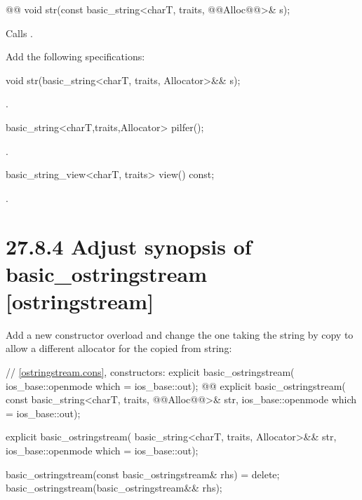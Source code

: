 \documentclass[ebook,11pt,article]{memoir}
\begin{document}
\begin{itemdecl}
    @@
    void str(const basic_string<charT, traits, @@Alloc@@>& s);
\end{itemdecl}

\begin{itemdescr}
\pnum
\effects
Calls
.
\end{itemdescr}


Add the following specifications:

\begin{addedblock}
\begin{itemdecl}
void str(basic_string<charT, traits, Allocator>&& s);
\end{itemdecl}
\begin{itemdescr}
\pnum
\effects {}.
\end{itemdescr}
\begin{itemdecl}
basic_string<charT,traits,Allocator> pilfer();
\end{itemdecl}
\begin{itemdescr}
\pnum
\returns {}.
\end{itemdescr}
\begin{itemdecl}
basic_string_view<charT, traits> view() const;
\end{itemdecl}
\begin{itemdescr}
\pnum
\returns {}.
\end{itemdescr}
\end{addedblock}


\section{27.8.4 Adjust synopsis of basic\_ostringstream [ostringstream]}
Add a new constructor overload and change the one taking the string by copy to allow a different allocator for the copied from string:
\begin{codeblock}
    // \ref{ostringstream.cons}, constructors:
    explicit basic_ostringstream(
      ios_base::openmode which = ios_base::out);
    @@
    explicit basic_ostringstream(
      const basic_string<charT, traits, @@Alloc@@>& str,
      ios_base::openmode which = ios_base::out);
\end{codeblock}
\begin{addedblock}
\begin{codeblock}
    explicit basic_ostringstream(
      basic_string<charT, traits, Allocator>&& str,
      ios_base::openmode which = ios_base::out);
\end{codeblock}
\end{addedblock}
\begin{codeblock}
    basic_ostringstream(const basic_ostringstream& rhs) = delete;
    basic_ostringstream(basic_ostringstream&& rhs);
\end{codeblock}
\end{document}
